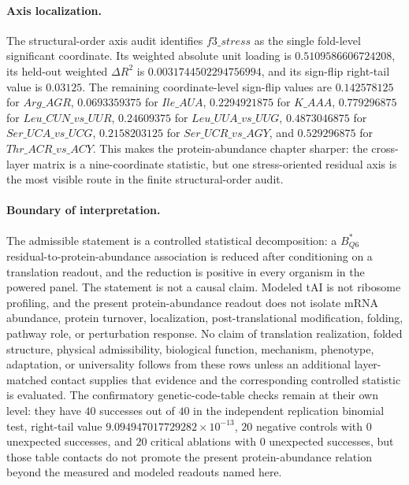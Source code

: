 \paragraph{Axis localization.}
The structural-order axis audit identifies $f3\_stress$ as the single fold-level significant coordinate. Its weighted absolute unit loading is $0.5109586606724208$, its held-out weighted $\Delta R^2$ is $0.0031744502294756994$, and its sign-flip right-tail value is $0.03125$. The remaining coordinate-level sign-flip values are $0.142578125$ for $Arg\_AGR$, $0.0693359375$ for $Ile\_AUA$, $0.2294921875$ for $K\_AAA$, $0.779296875$ for $Leu\_CUN\_vs\_UUR$, $0.24609375$ for $Leu\_UUA\_vs\_UUG$, $0.4873046875$ for $Ser\_UCA\_vs\_UCG$, $0.2158203125$ for $Ser\_UCR\_vs\_AGY$, and $0.529296875$ for $Thr\_ACR\_vs\_ACY$. This makes the protein-abundance chapter sharper: the cross-layer matrix is a nine-coordinate statistic, but one stress-oriented residual axis is the most visible route in the finite structural-order audit.

\paragraph{Boundary of interpretation.}
The admissible statement is a controlled statistical decomposition: a $B^{*}_{Q6}$ residual-to-protein-abundance association is reduced after conditioning on a translation readout, and the reduction is positive in every organism in the powered panel. The statement is not a causal claim. Modeled tAI is not ribosome profiling, and the present protein-abundance readout does not isolate mRNA abundance, protein turnover, localization, post-translational modification, folding, pathway role, or perturbation response. No claim of translation realization, folded structure, physical admissibility, biological function, mechanism, phenotype, adaptation, or universality follows from these rows unless an additional layer-matched contact supplies that evidence and the corresponding controlled statistic is evaluated. The confirmatory genetic-code-table checks remain at their own level: they have $40$ successes out of $40$ in the independent replication binomial test, right-tail value $9.094947017729282\times 10^{-13}$, $20$ negative controls with $0$ unexpected successes, and $20$ critical ablations with $0$ unexpected successes, but those table contacts do not promote the present protein-abundance relation beyond the measured and modeled readouts named here.

